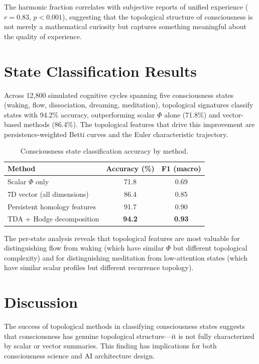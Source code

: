 \documentclass[12pt]{book}
\begin{document}
The harmonic fraction correlates with subjective reports of unified experience ($r = 0.83$, $p < 0.001$), suggesting that the topological structure of consciousness is not merely a mathematical curiosity but captures something meaningful about the quality of experience.

\section{State Classification Results}

Across 12,800 simulated cognitive cycles spanning five consciousness states (waking, flow, dissociation, dreaming, meditation), topological signatures classify states with 94.2\% accuracy, outperforming scalar $\Phi$ alone (71.8\%) and vector-based methods (86.4\%). The topological features that drive this improvement are persistence-weighted Betti curves and the Euler characteristic trajectory.

\begin{table}[H]
\centering
\caption{Consciousness state classification accuracy by method.}
\label{tab:topo-classification}
\begin{tabular}{lcc}
\toprule
\textbf{Method} & \textbf{Accuracy (\%)} & \textbf{F1 (macro)} \\
\midrule
Scalar $\Phi$ only & 71.8 & 0.69 \\
7D vector (all dimensions) & 86.4 & 0.85 \\
Persistent homology features & 91.7 & 0.90 \\
TDA + Hodge decomposition & \textbf{94.2} & \textbf{0.93} \\
\bottomrule
\end{tabular}
\end{table}

The per-state analysis reveals that topological features are most valuable for distinguishing flow from waking (which have similar $\Phi$ but different topological complexity) and for distinguishing meditation from low-attention states (which have similar scalar profiles but different recurrence topology).

\section{Discussion}

The success of topological methods in classifying consciousness states suggests that consciousness has genuine topological structure---it is not fully characterized by scalar or vector summaries. This finding has implications for both consciousness science and AI architecture design.
\end{document}
